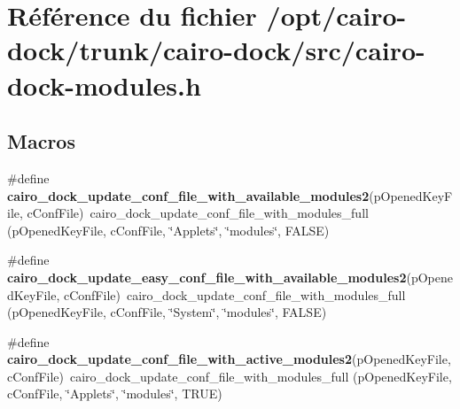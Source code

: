 \section{Référence du fichier /opt/cairo-dock/trunk/cairo-dock/src/cairo-dock-modules.h}
\label{cairo-dock-modules_8h}
\subsection*{Macros}
\begin{CompactItemize}
\item 
\#define {\bf cairo\_\-dock\_\-update\_\-conf\_\-file\_\-with\_\-available\_\-modules2}(pOpenedKeyFile, cConfFile)~cairo\_\-dock\_\-update\_\-conf\_\-file\_\-with\_\-modules\_\-full (pOpenedKeyFile, cConfFile, \char`\"{}Applets\char`\"{}, \char`\"{}modules\char`\"{}, FALSE)
\item 
\#define {\bf cairo\_\-dock\_\-update\_\-easy\_\-conf\_\-file\_\-with\_\-available\_\-modules2}(pOpenedKeyFile, cConfFile)~cairo\_\-dock\_\-update\_\-conf\_\-file\_\-with\_\-modules\_\-full (pOpenedKeyFile, cConfFile, \char`\"{}System\char`\"{}, \char`\"{}modules\char`\"{}, FALSE)
\item 
\#define {\bf cairo\_\-dock\_\-update\_\-conf\_\-file\_\-with\_\-active\_\-modules2}(pOpenedKeyFile, cConfFile)~cairo\_\-dock\_\-update\_\-conf\_\-file\_\-with\_\-modules\_\-full (pOpenedKeyFile, cConfFile, \char`\"{}Applets\char`\"{}, \char`\"{}modules\char`\"{}, TRUE)
\end{CompactItemize}
